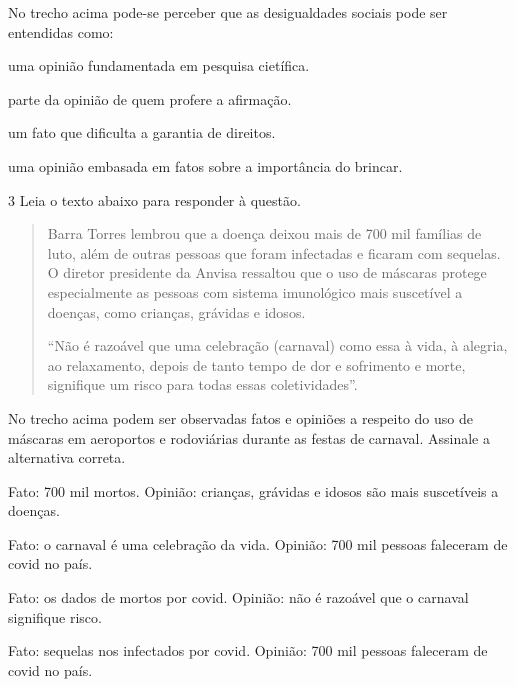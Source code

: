 No trecho acima pode-se perceber que as desigualdades sociais pode ser
entendidas como:

\begin{escolha}

  \item uma opinião fundamentada em pesquisa cietífica.
  
  \item parte da opinião de quem profere a afirmação.
  
  \item um fato que dificulta a garantia de direitos.
  
  \item uma opinião embasada em fatos sobre a importância do brincar.

\end{escolha}





\num{3} Leia o texto abaixo para responder à questão.

\begin{quote}

Barra Torres lembrou que a doença deixou mais de 700 mil famílias de
luto, além de outras pessoas que foram infectadas e ficaram com
sequelas. O diretor presidente da Anvisa ressaltou que o uso de máscaras
protege especialmente as pessoas com sistema imunológico mais suscetível
a doenças, como crianças, grávidas e idosos.  

``Não é razoável que uma celebração (carnaval) como essa à vida, à
alegria, ao relaxamento, depois de tanto tempo de dor e sofrimento e
morte, signifique um risco para todas essas coletividades''.

\end{quote}


No trecho acima podem ser observadas fatos e opiniões a respeito do uso
de máscaras em aeroportos e rodoviárias durante as festas de carnaval.
Assinale a alternativa correta.

\begin{escolha}

  \item Fato: 700 mil mortos. Opinião: crianças, grávidas e idosos são mais suscetíveis a doenças.

  \item Fato: o carnaval é uma celebração da vida. Opinião: 700 mil pessoas faleceram de covid no país.
  
  \item Fato: os dados de mortos por covid. Opinião: não é razoável que o carnaval signifique risco.
  
  \item Fato: sequelas nos infectados por covid. Opinião: 700 mil pessoas faleceram de covid no país.

\end{escolha}


